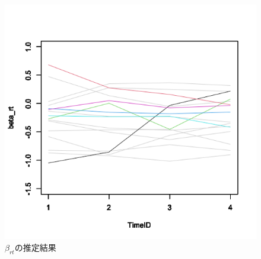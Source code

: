 \documentclass[a4paper,11pt,oneside,openany]{jsbook}
\begin{document}
\begin{figure}[tb]
  \begin{center}
  \includegraphics[keepaspectratio]{img/beta_rt.png}
 \caption{$\beta_{rt}$の推定結果}\label{beta_rt_data_img}
\end{center}
\end{figure}
\end{document}
